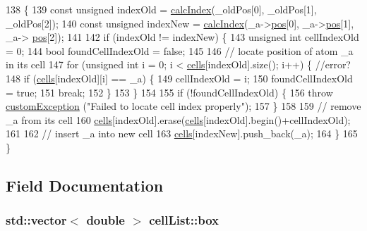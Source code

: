 \begin{DoxyCode}
138                                                                         \{
139     \textcolor{keyword}{const} \textcolor{keywordtype}{unsigned} indexOld = \hyperlink{classcell_list_aa6b843131cd487164a137571c7343cab}{calcIndex}(\_oldPos[0], \_oldPos[1], \_oldPos[2]);
140     \textcolor{keyword}{const} \textcolor{keywordtype}{unsigned} indexNew = \hyperlink{classcell_list_aa6b843131cd487164a137571c7343cab}{calcIndex}(\_a->\hyperlink{classatom_a3ae5f4880e7831d8b2c9fda72b4eb24a}{pos}[0], \_a->\hyperlink{classatom_a3ae5f4880e7831d8b2c9fda72b4eb24a}{pos}[1], \_a->
      \hyperlink{classatom_a3ae5f4880e7831d8b2c9fda72b4eb24a}{pos}[2]);
141 
142     \textcolor{keywordflow}{if} (indexOld != indexNew) \{
143         \textcolor{keywordtype}{unsigned} \textcolor{keywordtype}{int} cellIndexOld = 0;
144         \textcolor{keywordtype}{bool} foundCellIndexOld = \textcolor{keyword}{false};
145 
146         \textcolor{comment}{// locate position of atom \_a in its cell}
147         \textcolor{keywordflow}{for} (\textcolor{keywordtype}{unsigned} \textcolor{keywordtype}{int} i = 0; i < \hyperlink{classcell_list_a10bc0c3ae819293b1e88bc7d1bfdb2aa}{cells}[indexOld].size(); i++) \{ \textcolor{comment}{//error?}
148             \textcolor{keywordflow}{if} (\hyperlink{classcell_list_a10bc0c3ae819293b1e88bc7d1bfdb2aa}{cells}[indexOld][i] == \_a) \{
149                 cellIndexOld = i;
150                 foundCellIndexOld = \textcolor{keyword}{true};
151                 \textcolor{keywordflow}{break};
152             \}
153         \}
154 
155         \textcolor{keywordflow}{if} (!foundCellIndexOld) \{
156             \textcolor{keywordflow}{throw} \hyperlink{classcustom_exception}{customException} (\textcolor{stringliteral}{"Failed to locate cell index properly"});
157         \}
158 
159         \textcolor{comment}{// remove \_a from its cell}
160         \hyperlink{classcell_list_a10bc0c3ae819293b1e88bc7d1bfdb2aa}{cells}[indexOld].erase(\hyperlink{classcell_list_a10bc0c3ae819293b1e88bc7d1bfdb2aa}{cells}[indexOld].begin()+cellIndexOld);
161 
162         \textcolor{comment}{// insert \_a into new cell}
163         \hyperlink{classcell_list_a10bc0c3ae819293b1e88bc7d1bfdb2aa}{cells}[indexNew].push\_back(\_a);
164     \}
165 \}
\end{DoxyCode}


\subsection{Field Documentation}
\hypertarget{classcell_list_ae65748b80d5e06edfa22daaf569f2757}{
\subsubsection[{box}]{\setlength{\rightskip}{0pt plus 5cm}std\-::vector$<$ double $>$ cell\-List\-::box}}\label{classcell_list_ae65748b80d5e06edfa22daaf569f2757}


